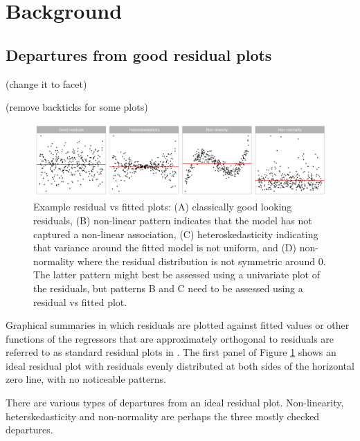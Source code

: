 \documentclass[]{interact}
\theoremstyle{plain}%
\theoremstyle{definition}
\theoremstyle{remark}
\begin{document}
\hypertarget{background}{%
\section{Background}\label{background}}

\hypertarget{departures-from-good-residual-plots}{%
\subsection{Departures from good residual
plots}\label{departures-from-good-residual-plots}}

(change it to facet)

(remove backticks for some plots)

\begin{figure}

{\centering \includegraphics[width=1\linewidth]{paper_comparison_files/figure-latex/residual-plot-common-departures-1} 

}

\caption{Example residual vs fitted plots: (A) classically good looking residuals, (B) non-linear pattern indicates that the model has not captured a non-linear association, (C) heteroskedasticity indicating that variance around the fitted model is not uniform, and (D) non-normality where the residual distribution is not symmetric around 0. The latter pattern might best be assessed using a univariate plot of the residuals, but patterns B and C need to be assessed using a residual vs fitted plot.}\label{fig:residual-plot-common-departures}
\end{figure}

Graphical summaries in which residuals are plotted against fitted values
or other functions of the regressors that are approximately orthogonal
to residuals are referred to as standard residual plots in
\citet{cook1982residuals}. The first panel of Figure
\ref{fig:residual-plot-common-departures} shows an ideal residual plot
with residuals evenly distributed at both sides of the horizontal zero
line, with no noticeable patterns.

There are various types of departures from an ideal residual plot.
Non-linearity, heterskedasticity and non-normality are perhaps the three
mostly checked departures.
\end{document}
